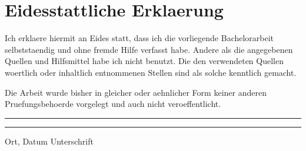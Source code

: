 \chapter*{Eidesstattliche Erklaerung}

Ich erklaere hiermit an Eides statt, dass ich die vorliegende Bachelorarbeit selbststaendig und ohne fremde Hilfe verfasst habe. Andere als die angegebenen Quellen und Hilfsmittel habe ich nicht benutzt. Die den verwendeten Quellen woertlich oder inhaltlich entnommenen Stellen sind als solche kenntlich gemacht.

Die Arbeit wurde bisher in gleicher oder aehnlicher Form keiner anderen Pruefungsbehoerde vorgelegt und auch nicht veroeffentlicht.

\vspace{2cm}

\noindent\rule{6cm}{0.4pt} \hfill \rule{6cm}{0.4pt}

\noindent Ort, Datum \hfill Unterschrift
